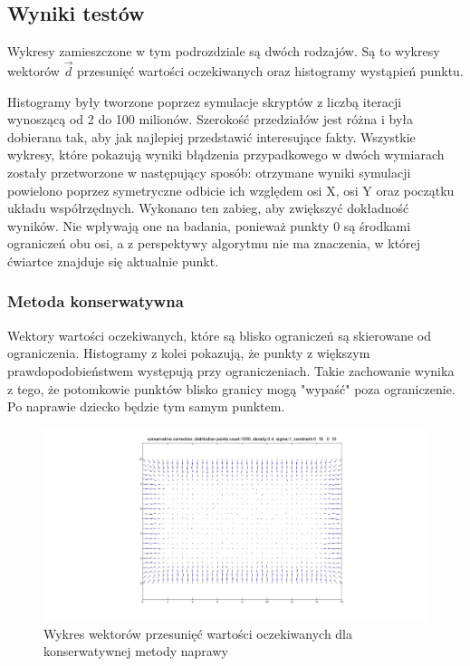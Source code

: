 \documentclass{mini}
\begin{document}
\subsection{Wyniki testów}
\hspace{3,4ex}Wykresy zamieszczone w tym podrozdziale są dwóch rodzajów. Są to wykresy wektorów $\overrightarrow{d}$ przesunięć wartości oczekiwanych oraz histogramy wystąpień punktu.

Histogramy były tworzone poprzez symulacje skryptów z liczbą iteracji wynoszącą od 2 do 100 milionów. Szerokość przedziałów jest różna i była dobierana tak, aby jak najlepiej przedstawić interesujące fakty. Wszystkie wykresy, które pokazują wyniki błądzenia przypadkowego w dwóch wymiarach zostały przetworzone w następujący sposób: otrzymane wyniki symulacji powielono poprzez symetryczne odbicie ich względem osi X, osi Y oraz początku układu współrzędnych. Wykonano ten zabieg, aby zwiększyć dokładność wyników. Nie wpływają one na badania, ponieważ punkty 0 są środkami ograniczeń obu osi, a z perspektywy algorytmu nie ma znaczenia, w której ćwiartce znajduje się aktualnie punkt.

\subsubsection*{Metoda konserwatywna}
\hspace{3,4ex}Wektory wartości oczekiwanych, które są blisko ograniczeń są skierowane od ograniczenia. Histogramy z kolei pokazują, że punkty z większym prawdopodobieństwem występują przy ograniczeniach. Takie zachowanie wynika z tego, że potomkowie punktów blisko granicy mogą "wypaść" poza ograniczenie. Po naprawie dziecko będzie tym samym punktem.

\begin{figure}[H]
\centering
\includegraphics[width=\textwidth]{conservative2dprzesuniecie}
\caption{Wykres wektorów przesunięć wartości oczekiwanych dla konserwatywnej metody naprawy}
\end{figure}
\end{document}
